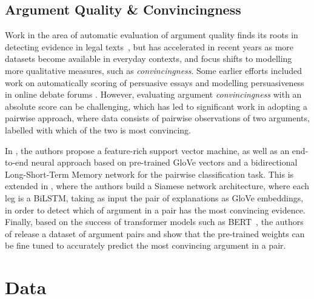 \documentclass[runningheads]{llncs}
\begin{document}
\subsection{Argument Quality \& Convincingness}

Work in the area of automatic evaluation of argument quality finds its roots in 
detecting evidence in legal texts~\cite{moens_automatic_2007}, but has 
accelerated in recent years as more datasets become available in everyday 
contexts, and focus shifts to modelling more qualitative measures, such as 
\textit{convincingness}. 
Some earlier efforts included work on automatically 
scoring of persuasive essays \cite{persing_end--end_2016} and modelling 
persuasiveness in online debate forums \cite{tan_winning_2016}. 
However, evaluating argument \textit{convincingness} with an absolute score can 
be challenging, which has led to significant work in adopting a pairwise 
approach, where data consists of pairwise observations of two arguments, 
labelled with which of the two is most convincing.

In \cite{habernal_which_2016}, the authors propose a feature-rich support 
vector machine, as well as an end-to-end neural approach based on pre-trained 
GloVe vectors\cite{pennington_glove:_2014} and a bidirectional Long-Short-Term 
Memory network for the pairwise classification task. 
This is extended in \cite{gleize_are_2019}, where the authors build a Siamese 
network architecture, where each leg is a BiLSTM, taking as input the pair of 
explanations as GloVe embeddings, in order to detect which of argument in a 
pair has the most convincing evidence.
Finally, based on the success of transformer models such as 
BERT~\cite{devlin_bert_2018}, the authors of \cite{toledo_automatic_2019}  
release a dataset of argument pairs and show that the pre-trained weights can 
be fine tuned to accurately predict the most convincing argument in a pair.


\section{Data}
\end{document}
